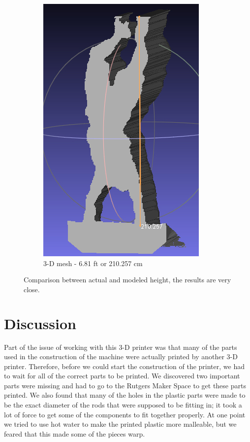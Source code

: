 \documentclass[pdftex,10.5pt]{report}
\begin{document}
\begin{figure}[H]
\begin{subfigure}[H]{0.4\textwidth}
		\includegraphics[width=\textwidth]{figures/ryanhandstandmeasure}
		\caption{3-D mesh - 6.81 ft or 210.257 cm}
	\end{subfigure}
	\caption{Comparison between actual and modeled height, the results are very close.}
	\label{fig:sizes}
\end{figure}
\section{Discussion}
Part of the issue of working with this 3-D printer was that many of the parts used in the construction of the machine were actually printed by another 3-D printer. Therefore, before we could start the construction of the printer, we had to wait for all of the correct parts to be printed. We discovered two important parts were missing and had to go to the Rutgers Maker Space to get these parts printed. We also found that many of the holes in the plastic parts were made to be the exact diameter of the rods that were supposed to be fitting in; it took a lot of force to get some of the components to fit together properly. At one point we tried to use hot water to make the printed plastic more malleable, but we feared that this made some of the pieces warp.
\end{document}
